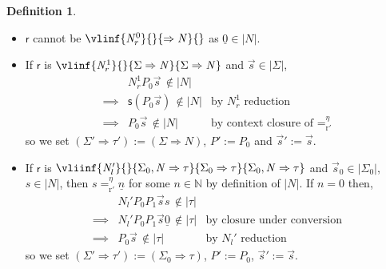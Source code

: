 \documentclass[10pt,a4paper]{amsart}
\theoremstyle{plain}
\theoremstyle{definition}
\newtheorem{definition}[definition]{Definition}
\theoremstyle{plain}
\theoremstyle{definition} %
\renewcommand{\succ}{\mathsf s}
\newcommand{\numeral}[1]{\underline{#1}}
\newcommand{\Nat}{\mathbb{N}}
\newcommand{\nat}{\mathit{N}}
\newcommand{\N}{\nat} %
\newcommand{\seqar}{\Rightarrow}
\newcommand{\Nzero}{\rr\N^0}
\newcommand{\Nsucc}{\rr\N^1}
\newcommand{\Ncnd}{\lr \N'}
\newcommand{\infrule}{\mathsf{r}}
\newcommand{\rrule}{\infrule} %
\newcommand{\lr}[1]{#1_l}
\newcommand{\rr}[1]{#1_r}
\newcommand{\reductionnorec}{\mathrm{r}'}
\newcommand{\convertsnoreceta}{=_{\reductionnorec}^\eta} %
\newcommand{\der}{P}
\newcommand{\hr}[1]{|#1|}
\begin{document}
\begin{definition}
\begin{itemize}
\[\]
Now, if $\der_0\, \vec s_0 \ \notin \hr{\tau_0}$ then we set $(\Sigma'\seqar \tau') := (\Sigma_0 \seqar \tau_0)$, $\der' := \der_0$ and $\vec s' := \vec s_0$.
Otherwise $\der_0\, \vec s_0 \ \in \hr{\tau_0}$ so we set 
$(\Sigma'\seqar \tau') := (\Sigma_1 \seqar \tau_1)$, $\der' := \der_1$ and $\vec s' := (\vec s_1, \der_0\, \vec s_0)$.
\item $\rrule$ cannot be 
\(
\vlinf{\Nzero}{}{\seqar \nat}{}
\)
as $\numeral 0 \in \hr \nat$.
\item If $\rrule$ is
\(
\vlinf{\Nsucc}{}{\Sigma \seqar \nat}{\Sigma \seqar \nat}
\)
and $\vec s \in \hr{\Sigma}$,
\[
\begin{array}{rll}
     & \Nsucc \der_0  \vec s \, \notin \hr\nat \\
     \implies & \succ (\der_0 \vec s) \, \notin \hr \nat & \text{by $\Nsucc $ reduction} \\
     \implies & \der_0 \vec s \, \notin \hr \nat  & \text{by context closure of $\convertsnoreceta$}
\end{array}
\]
so we set $(\Sigma'\seqar \tau'):= (\Sigma \seqar \nat)$, $\der' := \der_0$ and $\vec s' := \vec s$.
\item If $\rrule$ is
\(
\vliinf{\Ncnd}{}{\Sigma_0,\nat \seqar \tau}{\Sigma_0 \seqar \tau}{\Sigma_0,\nat \seqar \tau}
\)
and $\vec s_0 \in \hr{\Sigma_0}$, $s \in \hr \nat$, then $s\convertsnoreceta \numeral n$ for some $n\in \Nat$ by definition of $\hr\nat$.
If $n=0$ then,
\[
\begin{array}{rll}
     &  \Ncnd \der_0 \der_1 \vec s s \, \notin \hr \tau \\
     \implies & \Ncnd \der_0\der_1 \vec s \numeral 0 \, \notin \hr \tau & \text{by closure under conversion} \\
     \implies & \der_0 \vec s \, \notin \hr \tau & \text{by $\Ncnd$ reduction}
\end{array}
\]
so we set $(\Sigma'\seqar \tau'):= (\Sigma_0 \seqar \tau)$, $\der':= \der_0$, $\vec s' := \vec s$.


\end{itemize}
\end{definition}
\end{document}
